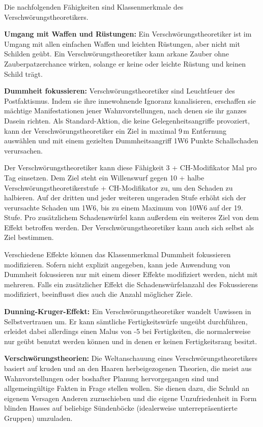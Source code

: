\documentclass[
	ngerman,
	a4paper,
	11pt,
	twocolumn,
]{scrartcl}
\begin{document}
Die nachfolgenden Fähigkeiten sind Klassenmerkmale des Verschwörungstheoretikers.

\textbf{Umgang mit Waffen und Rüstungen:} Ein Verschwörungstheoretiker ist im Umgang mit allen einfachen Waffen und leichten Rüstungen, aber nicht mit Schilden geübt. Ein Verschwörungstheoretiker kann arkane Zauber ohne Zauberpatzerchance wirken, solange er keine oder leichte Rüstung und keinen Schild trägt.

\textbf{Dummheit fokussieren:} Verschwörungstheoretiker sind Leuchtfeuer des Postfaktismus. Indem sie ihre innewohnende Ignoranz kanalisieren, erschaffen sie mächtige Manifestationen jener Wahnvorstellungen, nach denen sie ihr ganzes Dasein richten. Als Standard-Aktion, die keine Gelegenheitsangriffe provoziert, kann der Verschwörungstheoretiker ein Ziel in maximal 9\,m Entfernung auswählen und mit einem gezielten Dummheitsangriff 1W6 Punkte Schallschaden verursachen.

Der Verschwörungstheoretiker kann diese Fähigkeit 3 + CH-Modifikator Mal pro Tag einsetzen. Dem Ziel steht ein Willenswurf gegen 10 + halbe Verschwörungstheoretikerstufe + CH-Modifikator zu, um den Schaden zu halbieren. Auf der dritten und jeder weiteren ungeraden Stufe erhöht sich der verursachte Schaden um 1W6, bis zu einem Maximum von 10W6 auf der 19. Stufe. Pro zusätzlichem Schadenswürfel kann außerdem ein weiteres Ziel von dem Effekt betroffen werden. Der Verschwörungstheoretiker kann auch sich selbst als Ziel bestimmen.

Verschiedene Effekte können das Klassenmerkmal Dummheit fokussieren modifizieren. Sofern nicht explizit angegeben, kann jede Anwendung von Dummheit fokussieren nur mit einem dieser Effekte modifiziert werden, nicht mit mehreren. Falls ein zusätzlicher Effekt die Schadenswürfelanzahl des Fokussierens modifiziert, beeinflusst dies auch die Anzahl möglicher Ziele.

\textbf{Dunning-Kruger-Effekt:} Ein Verschwörungstheoretiker wandelt Unwissen in Selbstvertrauen um. Er kann sämtliche Fertigkeitswürfe ungeübt durchführen, erleidet dabei allerdings einen Malus von -5 bei Fertigkeiten, die normalerweise nur geübt benutzt werden können und in denen er keinen Fertigkeitsrang besitzt.

\textbf{Verschwörungstheorien:} Die Weltanschauung eines Verschwörungstheoretikers basiert auf kruden und an den Haaren herbeigezogenen Theorien, die meist aus Wahnvorstellungen oder boshafter Planung hervorgegangen sind und allgemeingültige Fakten in Frage stellen wollen. Sie dienen dazu, die Schuld an eigenem Versagen Anderen zuzuschieben und die eigene Unzufriedenheit in Form blinden Hasses auf beliebige Sündenböcke (idealerweise unterrepräsentierte Gruppen) umzuladen.
\end{document}
